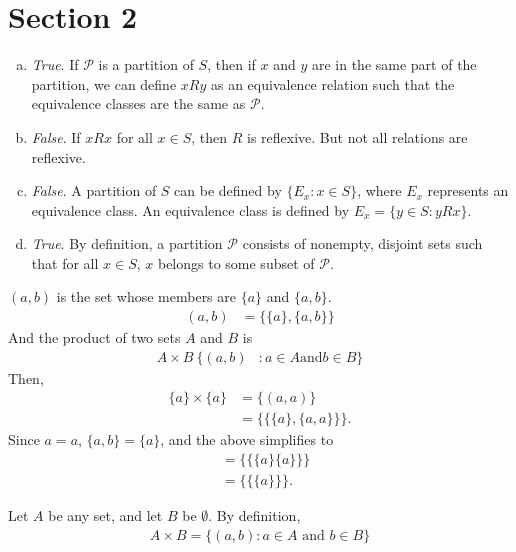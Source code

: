 \documentclass[12pt]{scrartcl} %
\begin{document}
\section{Section 2}

\begin{enumerate}[(a)]
	\item \emph{True}. If $\mathscr{P}$ is a partition of $S$, then if $x$ and $y$ are in the same part of the partition, we can define $x R y$ as an equivalence relation such that the equivalence classes are the same as $\mathscr{P}$.
	\item \emph{False}. If $xRx$ for all $x \in S$, then $R$ is reflexive. But not all relations are reflexive.
	\item \emph{False}. A partition of $S$ can be defined by $\{E_x: x \in S \}$, where $E_x$ represents an equivalence class. An equivalence class is defined by $E_x = \{y \in S: yRx\}$.
	\item \emph{True}. By definition, a partition $\mathscr{P}$ consists of nonempty, disjoint sets such that for all $x \in S$, $x$ belongs to some subset of $\mathscr{P}$.
\end{enumerate}

$(a,b)$  is the set whose members are $\{a\}$ and $\{a,b\}$.
	\begin{align*}
	(a,b) &= \{\{a\}, \{a,b\}\}
	\end{align*}
	And the product of two sets $A$ and $B$ is
	\begin{align*}
	A \times B \ \{(a,b) &: a \in A \text{and} b \in B \}
	\end{align*}		
	Then,
	\begin{align*}
	\{a\} \times \{a\} &= \{(a,a)\} \\
	&= \{\{ \{a\}, \{a, a\} \}\}.
	\end{align*}
	Since $a = a$, $\{a, b\} = \{a\}$, and the above simplifies to
	\begin{align*}
	&= \{\{\{a\} \{a\}\}\} \\
	&= \{\{\{a\}\}\}.
	\end{align*}

	Let $A$ be any set, and let $B$ be $\emptyset$. 
	By definition, 
	\begin{align*}
	A\times B = \{(a,b): a \in A \text{ and } b \in B \}
	\end{align*}
	
\end{document}
